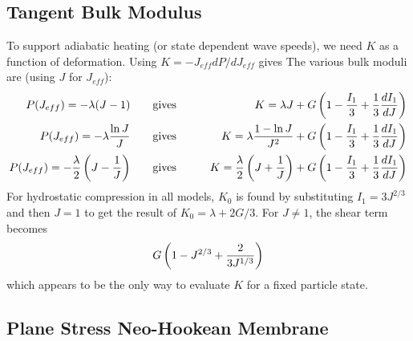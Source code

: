 \documentclass[11pt]{book}
\def\Jeff{J_{eff}}
\begin{document}
\subsection{Tangent Bulk Modulus}

To support adiabatic heating (or state dependent wave speeds), we need $K$ as a function of deformation. Using $K = -\Jeff dP/d\Jeff$ gives
The various bulk moduli are (using $J$ for $\Jeff$):
\begin{eqnarray}
   P(\Jeff) = -\lambda(J-1) &\qquad{\rm gives}\qquad & K = \lambda J + G\left(1 - {I_1\over 3} + {1\over 3}{dI_1\over dJ}\right)\\
   P(\Jeff) = -\lambda {\ln J\over J} &\qquad{\rm gives}\qquad& K = \lambda{1-\ln J \over J ^2} + G\left(1 - {I_1\over 3}+ {1\over 3}{dI_1\over dJ}\right) \\
   P(\Jeff) = - {\lambda\over 2}\left(J -{1\over J }\right) &\qquad{\rm gives}\qquad& K =  {\lambda\over 2}\left(J + {1\over J}\right) + G\left(1 - {I_1\over 3}+ {1\over 3}{dI_1\over dJ}\right)
\end{eqnarray}
For hydrostatic compression in all models, $K_0$ is found by substituting $I_1=3J^{2/3}$ and then $J=1$ to get the result of $K_0 = \lambda + 2G/3$. For $J\ne1$, the shear term becomes
\begin{equation}
       G\left(1 - J^{2/3} + {2\over 3 J^{1/3}}\right)
\end{equation}
which appears to be the only way to evaluate $K$ for a fixed particle state.

\subsection{Plane Stress Neo-Hookean Membrane}
\end{document}
